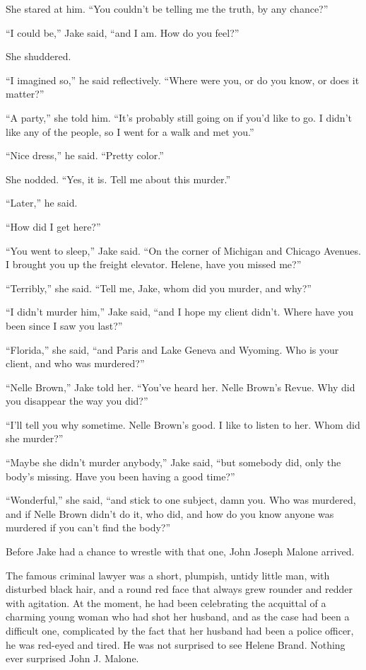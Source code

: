 \documentclass{novel}
\begin{document}
She stared at him. “You couldn’t be telling me the truth, by any chance?”

“I could be,” Jake said, “and I am. How do you feel?”

She shuddered.

“I imagined so,” he said reflectively. “Where were you, or do you know, or does it matter?”

“A party,” she told him. “It’s probably still going on if you’d like to go. I didn’t like any of the people, so I went for a walk and met you.”

“Nice dress,” he said. “Pretty color.”

She nodded. “Yes, it is. Tell me about this murder.”

“Later,” he said.

“How did I get here?”

“You went to sleep,” Jake said. “On the corner of Michigan and Chicago Avenues. I brought you up the freight elevator. Helene, have you missed me?”

“Terribly,” she said. “Tell me, Jake, whom did you murder, and why?”

“I didn’t murder him,” Jake said, “and I hope my client didn’t. Where have you been since I saw you last?”

“Florida,” she said, “and Paris and Lake Geneva and Wyoming. Who is your client, and who was murdered?”

“Nelle Brown,” Jake told her. “You’ve heard her. Nelle Brown’s Revue. Why did you disappear the way you did?”

“I'll tell you why sometime. Nelle Brown’s good. I like to listen to her. Whom did she murder?”

“Maybe she didn’t murder anybody,” Jake said, “but somebody did, only the body’s missing. Have you been having a good time?”

“Wonderful,” she said, “and stick to one subject, damn you. Who was murdered, and if Nelle Brown didn’t do it, who did, and how do you know anyone was murdered if you can’t find the body?”

Before Jake had a chance to wrestle with that one, John Joseph Malone arrived.

The famous criminal lawyer was a short, plumpish, untidy little man, with disturbed black hair, and a round red face that always grew rounder and redder with agitation. At the moment, he had been celebrating the acquittal of a charming young woman who had shot her husband, and as the case had been a difficult one, complicated by the fact that her husband had been a police officer, he was red-eyed and tired. He was not surprised to see Helene Brand. Nothing ever surprised John J. Malone.
\end{document}
